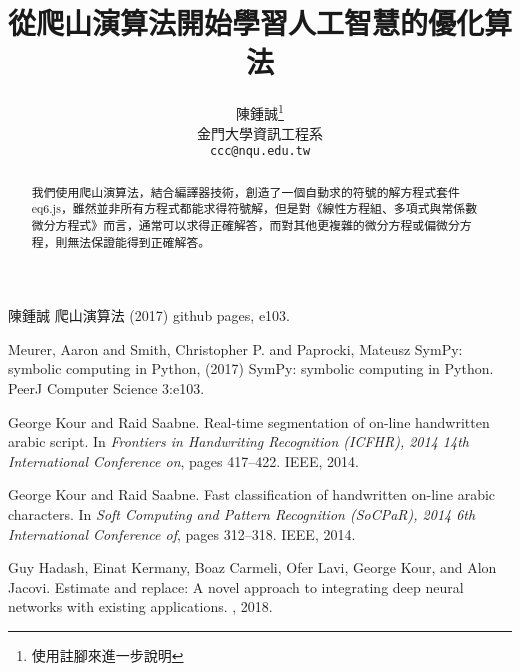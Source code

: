 \documentclass{article}
\title{從爬山演算法開始學習人工智慧的優化算法}
\author{
  陳鍾誠\thanks{使用註腳來進一步說明}\\
  金門大學資訊工程系\\
  \texttt{ccc@nqu.edu.tw} \\
}
\begin{document}
\maketitle

\begin{abstract}
我們使用爬山演算法，結合編譯器技術，創造了一個自動求的符號的解方程式套件 eq6.js，雖然並非所有方程式都能求得符號解，但是對《線性方程組、多項式與常係數微分方程式》而言，通常可以求得正確解答，而對其他更複雜的微分方程或偏微分方程，則無法保證能得到正確解答。
\end{abstract}






  


\begin{thebibliography}{1}

\bibitem{}
陳鍾誠
\newblock 爬山演算法
\newblock (2017) github pages, e103.

Meurer, Aaron and Smith, Christopher P. and Paprocki, Mateusz
\newblock SymPy: symbolic computing in Python,
\newblock (2017) SymPy: symbolic computing in Python. PeerJ Computer Science 3:e103.

George Kour and Raid Saabne.
\newblock Real-time segmentation of on-line handwritten arabic script.
\newblock In {\em Frontiers in Handwriting Recognition (ICFHR), 2014 14th
  International Conference on}, pages 417--422. IEEE, 2014.

George Kour and Raid Saabne.
\newblock Fast classification of handwritten on-line arabic characters.
\newblock In {\em Soft Computing and Pattern Recognition (SoCPaR), 2014 6th
  International Conference of}, pages 312--318. IEEE, 2014.

Guy Hadash, Einat Kermany, Boaz Carmeli, Ofer Lavi, George Kour, and Alon
  Jacovi.
\newblock Estimate and replace: A novel approach to integrating deep neural
  networks with existing applications.
, 2018.

\end{thebibliography}
\end{document}
